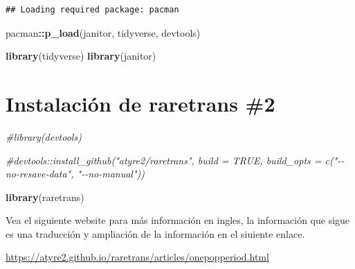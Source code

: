 \documentclass[
]{book}
\newenvironment{Shaded}{\begin{snugshade}}{\end{snugshade}}
\newcommand{\CommentTok}[1]{\textcolor[rgb]{0.56,0.35,0.01}{\textit{#1}}}
\newcommand{\FunctionTok}[1]{\textcolor[rgb]{0.13,0.29,0.53}{\textbf{#1}}}
\newcommand{\NormalTok}[1]{#1}
\newcommand{\SpecialCharTok}[1]{\textcolor[rgb]{0.81,0.36,0.00}{\textbf{#1}}}
\theoremstyle{definition}
\theoremstyle{definition}
\theoremstyle{definition}
\theoremstyle{definition}
\theoremstyle{remark}
\begin{document}
\begin{verbatim}
## Loading required package: pacman
\end{verbatim}

\begin{Shaded}
\begin{Highlighting}[]
\NormalTok{pacman}\SpecialCharTok{::}\FunctionTok{p\_load}\NormalTok{(janitor, tidyverse, devtools)}

\FunctionTok{library}\NormalTok{(tidyverse)}
\FunctionTok{library}\NormalTok{(janitor)}
\end{Highlighting}
\end{Shaded}

\hypertarget{instalaciuxf3n-de-raretrans-2}{%
\section{Instalación de raretrans \#2}\label{instalaciuxf3n-de-raretrans-2}}

\begin{Shaded}
\begin{Highlighting}[]
\CommentTok{\#library(devtools)}

\CommentTok{\#devtools::install\_github("atyre2/raretrans", build = TRUE, build\_opts = c("{-}{-}no{-}resave{-}data", "{-}{-}no{-}manual"))}

\FunctionTok{library}\NormalTok{(raretrans)}
\end{Highlighting}
\end{Shaded}

Vea el siguiente website para más información en ingles, la información que sigue es una traducción y ampliación de la información en el siuiente enlace.

\url{https://atyre2.github.io/raretrans/articles/onepopperiod.html}
\end{document}
